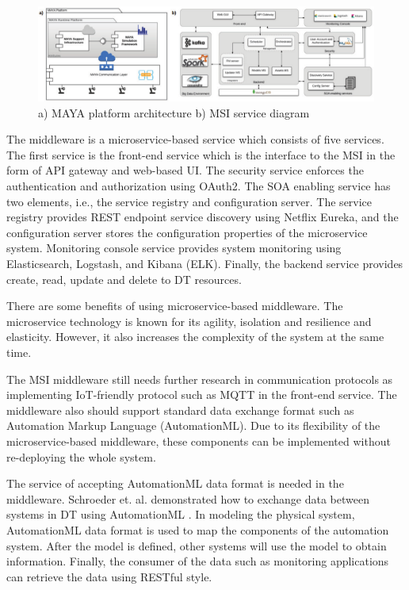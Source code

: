 \documentclass[article]{aaltoseries}
\begin{document}
\begin{figure}[t!]
	\begin{center}
		\includegraphics[width=1\textwidth]{figures/maya_platform}
		\caption{a) MAYA platform architecture b) MSI service diagram \cite{ciavotta2017microservice}}
		\label{fig:maya_platform}
	\end{center}
\end{figure}

The middleware is a microservice-based service which consists of five services. The first service is the front-end service which is the interface to the MSI in the form of API gateway and web-based UI. The security service enforces the authentication and authorization using OAuth2. The SOA enabling service has two elements, i.e., the service registry and configuration server. The service registry provides REST endpoint service discovery using Netflix Eureka, and the configuration server stores the configuration properties of the microservice system. Monitoring console service provides system monitoring using Elasticsearch, Logstash, and Kibana (ELK). Finally, the backend service provides create, read, update and delete to DT resources.

There are some benefits of using microservice-based middleware. The microservice technology is known for its agility, isolation and resilience and elasticity. However, it also increases the complexity of the system at the same time.

The MSI middleware still needs further research in communication protocols as implementing IoT-friendly protocol such as MQTT in the front-end service. The middleware also should support standard data exchange format such as Automation Markup Language (AutomationML). Due to its flexibility of the microservice-based middleware, these components can be implemented without re-deploying the whole system.

The service of accepting AutomationML data format is needed in the middleware. Schroeder et. al. demonstrated how to exchange data between systems in DT using AutomationML \cite{Schroeder2016automationml}. In modeling the physical system, AutomationML data format is used to map the components of the automation system. After the model is defined, other systems will use the model to obtain information. Finally, the consumer of the data such as monitoring applications can retrieve the data using RESTful style.
\end{document}
